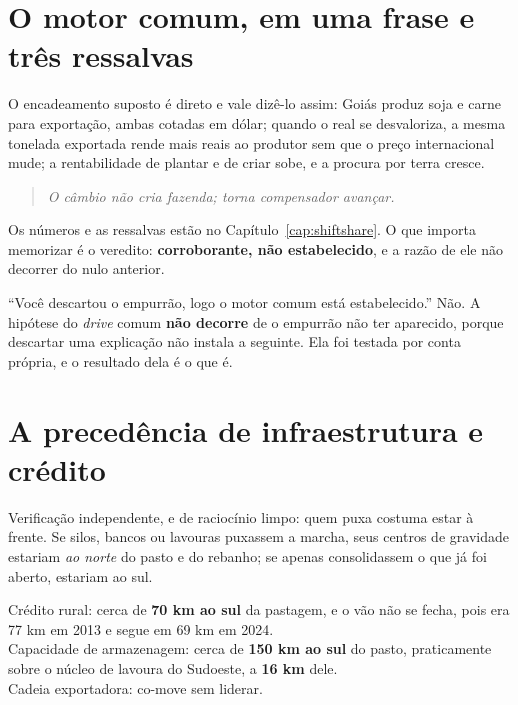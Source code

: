 \section{O motor comum, em uma frase e três ressalvas}

O encadeamento suposto é direto e vale dizê-lo assim: Goiás produz soja e carne
para exportação, ambas cotadas em dólar; quando o real se desvaloriza, a mesma
tonelada exportada rende mais reais ao produtor sem que o preço internacional
mude; a rentabilidade de plantar e de criar sobe, e a procura por terra cresce.

\begin{quote}\itshape\color{cortinta}
O câmbio não cria fazenda; torna compensador avançar.
\end{quote}

Os números e as ressalvas estão no Capítulo~\ref{cap:shiftshare}. O que importa
memorizar é o veredito: \textbf{corroborante, não estabelecido}, e a razão de
ele não decorrer do nulo anterior.

\begin{armadilha}
``Você descartou o empurrão, logo o motor comum está estabelecido.'' Não. A
hipótese do \emph{drive} comum \textbf{não decorre} de o empurrão não ter
aparecido, porque descartar uma explicação não instala a seguinte. Ela foi
testada por conta própria, e o resultado dela é o que é.
\end{armadilha}

\section{A precedência de infraestrutura e crédito}

Verificação independente, e de raciocínio limpo: quem puxa costuma estar à
frente. Se silos, bancos ou lavouras puxassem a marcha, seus centros de gravidade
estariam \emph{ao norte} do pasto e do rebanho; se apenas consolidassem o que já
foi aberto, estariam ao sul.

\begin{ancora}
Crédito rural: cerca de \textbf{70 km ao sul} da pastagem, e o vão não se
fecha, pois era 77 km em 2013 e segue em 69 km em 2024. \\
Capacidade de armazenagem: cerca de \textbf{150 km ao sul} do pasto,
praticamente sobre o núcleo de lavoura do Sudoeste, a \textbf{16 km} dele. \\
Cadeia exportadora: co-move sem liderar.
\end{ancora}


